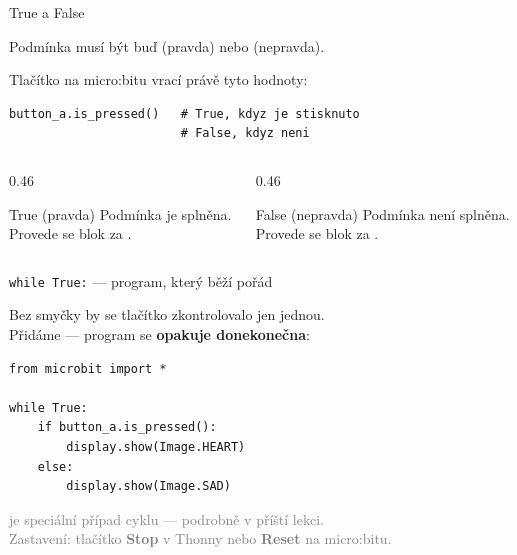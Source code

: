 \begin{frame}[fragile]{True a False}

  Podmínka musí být buď  (pravda) nebo  (nepravda).

  \bigskip
  Tlačítko na micro:bitu vrací právě tyto hodnoty:

  \begin{lstlisting}
button_a.is_pressed()   # True, kdyz je stisknuto
                        # False, kdyz neni
  \end{lstlisting}

  \bigskip
  \begin{columns}[T]
    \begin{column}{0.46\textwidth}
      \begin{block}{True (pravda)}
        Podmínka je splněna.\\
        Provede se blok za .
      \end{block}
    \end{column}
    \begin{column}{0.46\textwidth}
      \begin{block}{False (nepravda)}
        Podmínka není splněna.\\
        Provede se blok za .
      \end{block}
    \end{column}
  \end{columns}
\end{frame}

\begin{frame}[fragile]{\texttt{while True:} — program, který běží pořád}

  Bez smyčky by se tlačítko zkontrolovalo jen jednou.\\
  Přidáme  — program se \textbf{opakuje donekonečna}:

  \begin{lstlisting}
from microbit import *

while True:
    if button_a.is_pressed():
        display.show(Image.HEART)
    else:
        display.show(Image.SAD)
  \end{lstlisting}

  \bigskip
  \textcolor{gray}{\small
     je speciální případ cyklu — podrobně v příští lekci.\\
    Zastavení: tlačítko \textbf{Stop} v Thonny nebo \textbf{Reset} na micro:bitu.
  }
\end{frame}

